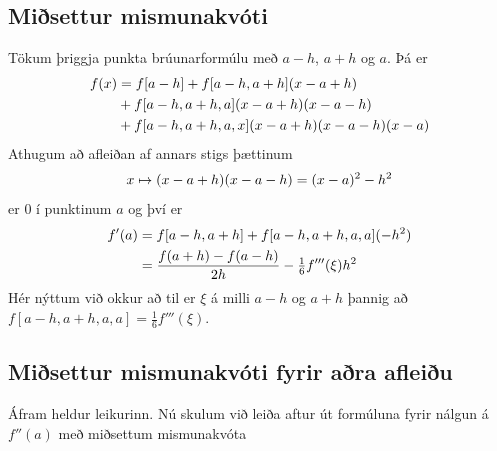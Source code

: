 \documentclass[letterpaper,10pt,icelandic]{sphinxmanual}
\begin{document}
\subsection{Miðsettur mismunakvóti}
\label{kafli04:id3}
Tökum þriggja punkta brúunarformúlu með \(a-h\), \(a+h\) og
\(a\). Þá er
\begin{gather}
\begin{split}\begin{aligned}
  f(x)&=f[a-h]+f[a-h,a+h](x-a+h)\\
  &+f[a-h,a+h,a](x-a+h)(x-a-h)\\
  &+f[a-h,a+h,a,x](x-a+h)(x-a-h)(x-a)\end{aligned}\end{split}\notag
\end{gather}
Athugum að afleiðan af annars stigs þættinum
\begin{gather}
\begin{split}x\mapsto (x-a+h)(x-a-h)=(x-a)^2-h^2\end{split}\notag
\end{gather}
er \(0\) í punktinum \(a\) og því er
\begin{gather}
\begin{split}\begin{aligned}
  f'(a)&=f[a-h,a+h]+f[a-h,a+h,a,a](-h^2)\\
  &=\dfrac{f(a+h)-f(a-h)}{2h}-\tfrac 16 f'''(\xi)h^2 \end{aligned}\end{split}\notag
\end{gather}
Hér nýttum við okkur að til er \(\xi\) á milli \(a-h\) og
\(a+h\) þannig að \(f[a-h,a+h,a,a]=\tfrac 16 f'''(\xi)\).


\subsection{Miðsettur mismunakvóti fyrir aðra afleiðu}
\label{kafli04:id4}
Áfram heldur leikurinn. Nú skulum við leiða aftur út formúluna fyrir
nálgun á \(f''(a)\) með miðsettum mismunakvóta
\end{document}
